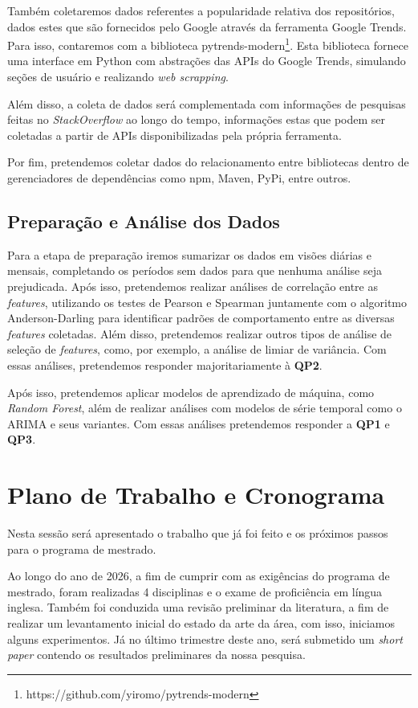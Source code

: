 \documentclass[11pt,a4paper]{article}
\newcommand{\en}[1]{\textit{#1}}
\begin{document}
Também coletaremos dados referentes a popularidade relativa dos repositórios, dados estes que são fornecidos pelo Google através da ferramenta Google Trends. Para isso, contaremos com a biblioteca pytrends-modern\footnote{https://github.com/yiromo/pytrends-modern}. Esta biblioteca fornece uma interface em Python com abstrações das APIs do Google Trends, simulando seções de usuário e realizando \en{web scrapping}.

Além disso, a coleta de dados será complementada com informações de pesquisas feitas no \en{StackOverflow} ao longo do tempo, informações estas que podem ser coletadas a partir de APIs disponibilizadas pela própria ferramenta.

Por fim, pretendemos coletar dados do relacionamento entre bibliotecas dentro de gerenciadores de dependências como npm, Maven, PyPi, entre outros.

\subsection{Preparação e Análise dos Dados}
Para a etapa de preparação iremos sumarizar os dados em visões diárias e mensais, completando os períodos sem dados para que nenhuma análise seja prejudicada. Após isso, pretendemos realizar análises de correlação entre as \en{features}, utilizando os testes de Pearson e Spearman juntamente com o algoritmo Anderson-Darling para identificar padrões de comportamento entre as diversas \en{features} coletadas. Além disso, pretendemos realizar outros tipos de análise de seleção de \en{features}, como, por exemplo, a análise de limiar de variância. Com essas análises, pretendemos responder majoritariamente à \textbf{QP2}.

Após isso, pretendemos aplicar modelos de aprendizado de máquina, como \en{Random Forest}, além de realizar análises com modelos de série temporal como o ARIMA e seus variantes. Com essas análises pretendemos responder a \textbf{QP1} e \textbf{QP3}.

\section{Plano de Trabalho e Cronograma}
Nesta sessão será apresentado o trabalho que já foi feito e os próximos passos para o programa de mestrado.

Ao longo do ano de 2026, a fim de cumprir com as exigências do programa de mestrado, foram realizadas 4 disciplinas e o exame de proficiência em língua inglesa. Também foi conduzida uma revisão preliminar da literatura, a fim de realizar um levantamento inicial do estado da arte da área, com isso, iniciamos alguns experimentos. Já no último trimestre deste ano, será submetido um \en{short paper} contendo os resultados preliminares da nossa pesquisa.
\end{document}
